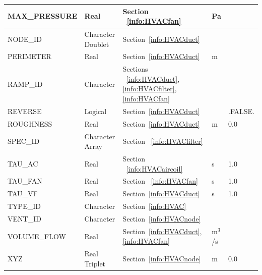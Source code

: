 \documentclass[11pt]{book}
\begin{document}
\begin{longtable}{@{\extracolsep{\fill}}|l|l|l|l|l|}
{\ct MAX\_PRESSURE}             & Real              &  Section ~\ref{info:HVACfan}                                                  &  Pa           &                \\ \hline
{\ct NODE\_ID}                  & Character Doublet & Section~\ref{info:HVACduct}                                                   &               &                \\ \hline
{\ct PERIMETER}                 & Real              & Section~\ref{info:HVACduct}                                                   &  m            &                \\ \hline
{\ct RAMP\_ID}                  & Character         & Sections ~\ref{info:HVACduct}, \ref{info:HVACfilter}, \ref{info:HVACfan}      &               &                \\ \hline
{\ct REVERSE}                   & Logical           & Section~\ref{info:HVACduct}                                                   &               & {\ct .FALSE.}  \\ \hline
{\ct ROUGHNESS}                 & Real              & Section~\ref{info:HVACduct}                                                   &  m            & 0.0            \\ \hline
{\ct SPEC\_ID}                  & Character Array   & Section ~\ref{info:HVACfilter}                                                &               &                \\ \hline
{\ct TAU\_AC}                   & Real              & Section ~\ref{info:HVACaircoil}                                               & s             & 1.0            \\ \hline
{\ct TAU\_FAN}                  & Real              & Section ~\ref{info:HVACfan}                                                   & s             & 1.0            \\ \hline
{\ct TAU\_VF}                   & Real              & Section~\ref{info:HVACduct}                                                   & s             & 1.0            \\ \hline
{\ct TYPE\_ID}                  & Character         & Section~\ref{info:HVAC}                                                       &               &                \\ \hline
{\ct VENT\_ID}                  & Character         & Section~\ref{info:HVACnode}                                                   &               &                \\ \hline
{\ct VOLUME\_FLOW}              & Real              & Section~\ref{info:HVACduct}, \ref{info:HVACfan}                               &  m$^3$/s      &                \\ \hline
{\ct XYZ}                       & Real Triplet      & Section~\ref{info:HVACnode}                                                   &  m            &  0.0           \\ \hline
\end{longtable}
\end{document}
